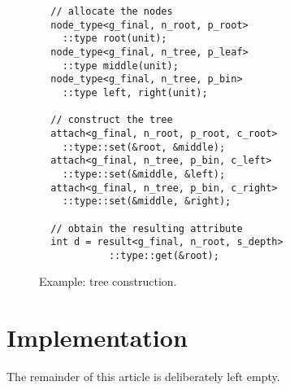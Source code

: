 \documentclass{llncs}
\begin{document}
  \begin{figure}[tb]
  \begin{lstlisting}
  // allocate the nodes
  node_type<g_final, n_root, p_root>
    ::type root(unit);
  node_type<g_final, n_tree, p_leaf>
    ::type middle(unit);
  node_type<g_final, n_tree, p_bin>
    ::type left, right(unit);

  // construct the tree
  attach<g_final, n_root, p_root, c_root>
    ::type::set(&root, &middle);
  attach<g_final, n_tree, p_bin, c_left>
    ::type::set(&middle, &left);
  attach<g_final, n_tree, p_bin, c_right>
    ::type::set(&middle, &right);

  // obtain the resulting attribute
  int d = result<g_final, n_root, s_depth>
            ::type::get(&root);
  \end{lstlisting}
  \caption{Example: tree construction.}
  \label{fig:example:construct}
  \end{figure}

\section{Implementation}
\label{sec:implementation}

  The remainder of this article is deliberately left empty.



\end{document}
